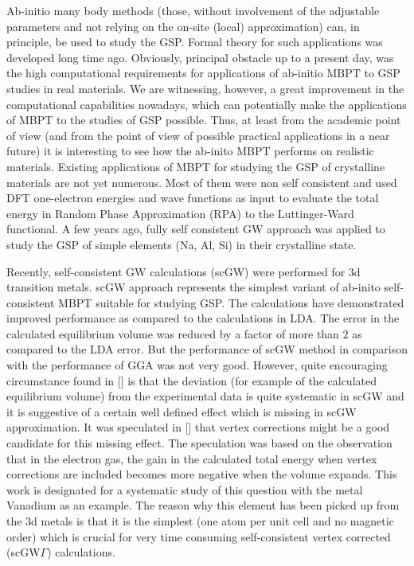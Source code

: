 \documentclass[aps,prb,floatfix,epsfig,twocolumn,preprintnumbers]{revtex4}
\begin{document}
Ab-initio many body methods (those, without involvement of the adjustable parameters and not relying on the on-site (local) approximation) can, in principle, be used to study the GSP. Formal theory for such applications was developed long time ago.\cite{pr_118_1417,AGD} Obviously, principal obstacle up to a present day, was the high computational requirements for applications of ab-initio MBPT to GSP studies in real materials. We are witnessing, however, a great improvement in the computational capabilities nowadays, which can potentially make the applications of MBPT to the studies of GSP possible. Thus, at least from the academic point of view (and from the point of view of possible practical applications in a near future) it is interesting to see how the ab-inito MBPT performs on realistic materials. Existing applications of MBPT for studying the GSP of crystalline materials are not yet numerous. Most of them were non self consistent and used DFT one-electron energies and wave functions as input to evaluate the total energy in Random Phase Approximation\cite{prb_66_245103,prl_103_056401,prl_105_196401,prb_87_214102} (RPA) to the Luttinger-Ward functional.\cite{pr_118_1417} A few years ago, fully self consistent GW approach was applied to study the GSP of simple elements (Na, Al, Si) in their crystalline state.\cite{prb_80_041103}

Recently, self-consistent GW calculations (scGW) were performed for 3d transition metals.\cite{jcm_29_465503} scGW approach represents the simplest variant of ab-inito self-consistent MBPT suitable for studying GSP. The calculations have demonstrated improved performance as compared to the calculations in LDA. The error in the calculated equilibrium volume was reduced by a factor of more than 2 as compared to the LDA error. But the performance of scGW method in comparison with the performance of GGA was not very good. However, quite encouraging circumstance found in [] is that the deviation (for example of the calculated equilibrium volume) from the experimental data is quite systematic in scGW and it is suggestive of a certain well defined effect which is missing in scGW approximation. It was speculated in [] that vertex corrections might be a good candidate for this missing effect. The speculation was based on the observation\cite{prb_96_035108} that in the electron gas, the gain in the calculated total energy when vertex corrections are included becomes more negative when the volume expands. This work is designated for a systematic study of this question with the metal Vanadium as an example. The reason why this element has been picked up from the 3d metals is that it is the simplest (one atom per unit cell and no magnetic order) which is crucial for very time consuming self-consistent vertex corrected (scGW$\Gamma$) calculations.
\end{document}
